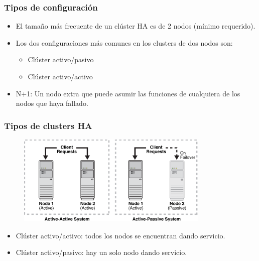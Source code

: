 \documentclass{beamer}
\begin{document}

\begin{frame}
\frametitle{Tipos de configuración}

\begin{itemize}
\item El tamaño más frecuente de un clúster HA es de \alert{2 nodos} (mínimo requerido).
\item Los dos configuraciones más comunes en los clusters de dos nodos son:
	\begin{itemize}
	\item \alert{Clúster activo/pasivo}
	\item \alert{Clúster activo/activo}
	\end{itemize}
\item \alert{N+1}: Un nodo extra que puede asumir las funciones de cualquiera de los nodos que haya fallado.
\end{itemize}

\end{frame}



\begin{frame}
\frametitle{Tipos de clusters HA}

\begin{figure}[h]

\begin{center}
  \centering
  \includegraphics[height=1.7in]{figs/clusters2.png}
\end{center}
\end{figure}

	\begin{itemize}
	\item \alert{Clúster activo/activo}: todos los nodos se encuentran dando servicio.
	\item \alert{Clúster activo/pasivo}: hay un solo nodo dando servicio.
	\end{itemize}

\end{frame}
\end{document}
